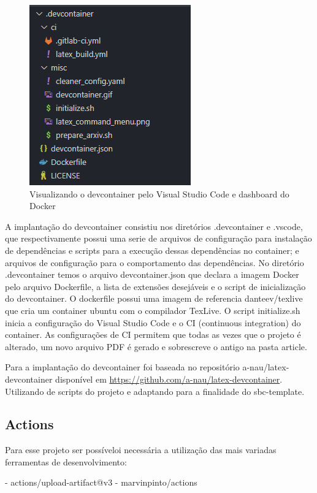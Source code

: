 \begin{figure}[ht]
	\centering
	\includegraphics[width=.5\textwidth]{./images/image12.png}
	\caption{Visualizando o devcontainer pelo Visual Studio Code e dashboard do Docker}
	\label{fig:image12}
\end{figure}
A implantação do devcontainer consistiu nos diretórios .devcontainer e .vscode, que respectivamente possui uma serie de arquivos de configuração para instalação de dependências e scripts para a execução dessas dependências no container; e arquivos de configuração para o comportamento das dependências.
No diretório .devcontainer temos o arquivo devcontainer.json que declara a imagem Docker pelo arquivo Dockerfile, a lista de extensões desejáveis e o script de inicialização do devcontainer. O dockerfile possui uma imagem de referencia  danteev/texlive que cria um container ubuntu com o compilador TexLive. O script initialize.sh inicia a configuração do Visual Studio Code e o CI (continuous integration) do container. As configurações de CI permitem que todas as vezes que o projeto é alterado, um novo arquivo PDF é gerado e sobrescreve o antigo na pasta article.

Para a implantação do devcontainer foi baseada no repositório a-nau/latex-devcontainer disponível em \url{https://github.com/a-nau/latex-devcontainer}. Utilizando de scripts do projeto e adaptando para a finalidade do sbc-template.

\subsection{Actions}

Para esse projeto ser possíveloi necessária a utilização das mais variadas ferramentas de desenvolvimento:

- actions/upload-artifact@v3
- marvinpinto/actions
